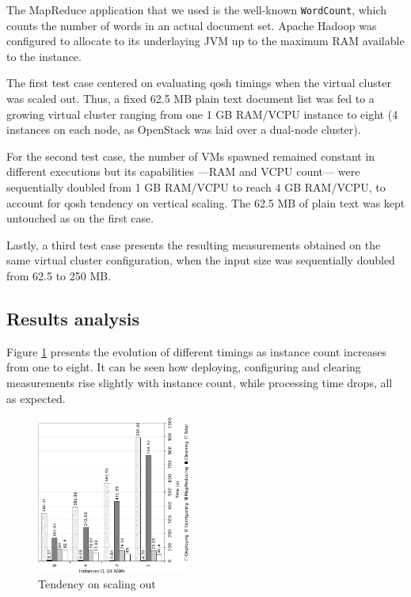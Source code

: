 \documentclass[conference]{IEEEtran}
\begin{document}
The MapReduce application that we used is the well-known \texttt{WordCount}, which counts the number of words in an actual document set. Apache Hadoop was configured to allocate to its underlaying JVM up to the maximum RAM available to the instance.

The first test case centered on evaluating qosh timings when the virtual cluster was scaled out. Thus, a fixed 62.5 MB plain text document list was fed to a growing virtual cluster ranging from one 1 GB RAM/VCPU instance to eight (4 instances on each node, as OpenStack was laid over a dual-node cluster).

For the second test case, the number of VMs spawned remained constant in different executions but its capabilities ---RAM and VCPU count--- were sequentially doubled from 1 GB RAM/VCPU to reach 4 GB RAM/VCPU, to account for qosh tendency on vertical scaling. The 62.5 MB of plain text was kept untouched as on the first case.

Lastly, a third test case presents the resulting measurements obtained on the same virtual cluster configuration, when the input size was sequentially doubled from 62.5 to 250 MB.

\subsection{Results analysis}
\noindent Figure \ref{fig:scaleout} presents the evolution of different timings as instance count increases from one to eight. It can be seen how deploying, configuring and clearing measurements rise slightly with instance count, while processing time drops, all as expected.

\begin{figure}[htp]
\centering
\includegraphics[width=0.45\textwidth]{img/007}
\caption{Tendency on scaling out}
\label{fig:scaleout}
\end{figure}
\end{document}
